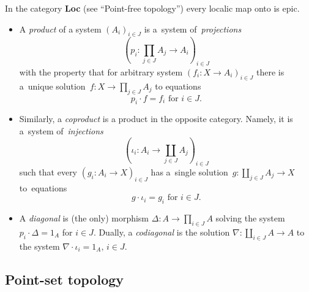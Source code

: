\begin{exmpl}
  In the category {\bf Loc} (see ``Point-free topology'') every localic map
  onto is epic.
\end{exmpl}

\begin{itemize}
\item A \emph{product} of a system $\left(A_i\right)_{i\in J}$ is a~system
of~\emph{projections\/}
\[
  \left(p_i\colon \prod_{j\in J} A_j \to A_i \right)_{i\in J}
\]
with the property that for arbitrary system $\left(f_i\colon X \to
A_i\right)_{i\in J}$ there is a~unique solution~$f\colon X \to \prod_{j\in
J} A_j$ to equations
\[
  p_i \cdot f = f_i \text{ for } i\in J.
\]

\item Similarly, a \emph{coproduct} is a product in the opposite category.
Namely, it is a~system of~\emph{injections\/}
\[
  \left(\iota_i\colon A_i \to \coprod_{j\in J} A_j \right)_{i\in J}
\]
such that every $\left(g_i\colon A_i \to X \right)_{i\in J}$ has a~single
solution~$g\colon \coprod_{j\in J} A_j \to X$ to~equations
\[
  g \cdot \iota_i = g_i \text{ for } i\in J.
\]

\item A \emph{diagonal} is (the only) morphism $\Delta\colon A \to \prod_{i\in
J} A$ solving the system $p_i\cdot \Delta = 1_A$ for $i \in J$.
Dually, a \emph{codiagonal} is the solution $\nabla\colon \coprod_{i\in J} A
\to A$ to the system $\nabla\cdot \iota_i = 1_A, \, i \in J$.
\end{itemize}


\subsection*{Point-set topology}

